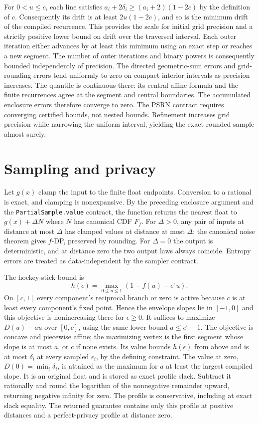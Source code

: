 \documentclass{article}
\begin{document}
For $0<u\leq c$, each line satisfies
$a_i+2\delta_i\geq(a_i+2)(1-2c)$ by the definition of $c$.
Consequently its drift is at least $2u(1-2c)$, and so is the minimum
drift of the compiled recurrence. This provides the scale for initial
grid precision and a strictly positive lower bound on drift over
the traversed interval. Each outer
iteration either advances by at least this minimum using an exact
step or reaches a new segment. The number of outer iterations and
binary powers is consequently bounded independently of precision.
The directed geometric-sum errors and grid-rounding errors tend
uniformly to zero on compact interior intervals as precision increases.
The quantile is continuous there: its central affine formula and
the finite recurrences agree at the segment and central boundaries.
The accumulated enclosure errors therefore converge to zero.
The PSRN contract requires converging certified bounds, not nested
bounds. Refinement increases grid precision while narrowing the uniform
interval, yielding the exact rounded sample almost surely.

\section{Sampling and privacy}
Let $g(x)$ clamp the input to the finite float endpoints. Conversion
to a rational is exact, and clamping is nonexpansive. By the preceding
enclosure argument and the \texttt{PartialSample.value} contract, the
function returns the nearest float to $g(x)+\Delta N$ where $N$ has
canonical CDF $F_f$. For $\Delta>0$, any pair of inputs at distance at
most $\Delta$ has clamped values at distance at most $\Delta$; the
canonical noise theorem \cite[Theorem~3.9]{awan2023canonical} gives
$f$-DP, preserved by rounding. For $\Delta=0$ the output is deterministic,
and at distance zero the two output laws always coincide. Entropy errors
are treated as data-independent by the sampler contract.

The hockey-stick bound is
\[
 h(\epsilon)=\max_{0\leq u\leq1}(1-f(u)-e^\epsilon u).
\]
On $[c,1]$ every component's reciprocal branch or zero is active
because $c$ is at least every component's fixed point. Hence the
envelope slopes lie in $[-1,0]$ and this objective is nonincreasing
there for $\epsilon\geq0$. It suffices to maximize $D(u)-a u$ over
$[0,c]$, using the same lower bound $a\leq e^\epsilon-1$.
The objective is concave and piecewise affine; the maximizing vertex
is the first segment whose slope is at most $a$, or $c$ if none exists.
Its value bounds $h(\epsilon)$ from above and is at most $\delta_i$
at every sampled $\epsilon_i$, by the defining constraint.
The value at zero, $D(0)=\min_i\delta_i$, is attained as the maximum
for $a$ at least the largest compiled slope. It is an original float
and is stored as exact profile slack. Subtract it rationally and round
the logarithm of the nonnegative remainder upward, returning negative
infinity for zero. The profile is conservative, including at exact
slack equality. The returned guarantee contains only this profile
at positive distances and a perfect-privacy profile at distance zero.

\printbibliography
\end{document}

